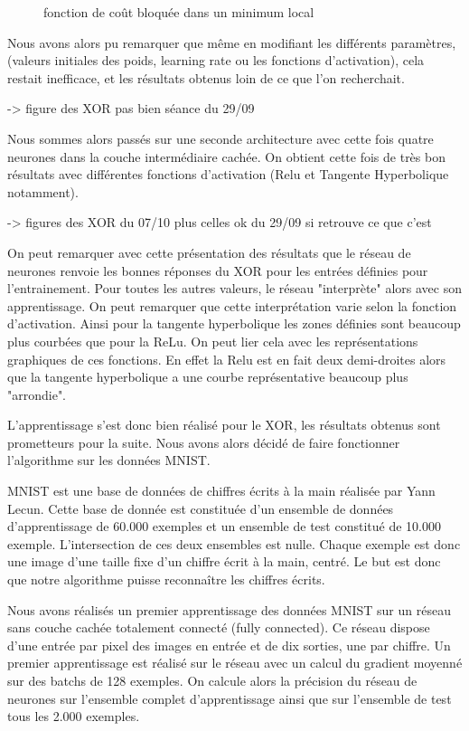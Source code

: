 \documentclass{report}
\begin{document}
\begin{figure}[!h]
\centering

\caption{fonction de coût bloquée dans un minimum local}
\label{xor_cout_bloque}
\end{figure}

Nous avons alors pu remarquer que même en modifiant les différents paramètres, (valeurs initiales des poids, learning rate ou les fonctions d'activation), cela restait inefficace, et les résultats obtenus loin de ce que l'on recherchait.

-> figure des XOR pas bien séance du 29/09

Nous sommes alors passés sur une seconde architecture avec cette fois quatre neurones dans la couche intermédiaire cachée. On obtient cette fois de très bon résultats avec différentes fonctions d'activation (Relu et Tangente Hyperbolique notamment).

-> figures des XOR du 07/10 plus celles ok du 29/09 si retrouve ce que c'est

On peut remarquer avec cette présentation des résultats que le réseau de neurones renvoie les bonnes réponses du XOR pour les entrées définies pour l'entrainement. Pour toutes les autres valeurs,  le réseau "interprète" alors avec son apprentissage. On peut remarquer que cette interprétation varie selon la fonction d'activation. Ainsi pour la tangente hyperbolique les zones définies sont beaucoup plus courbées que pour la ReLu. On peut lier cela avec les représentations graphiques de ces fonctions. En effet la Relu est en fait deux demi-droites alors que la tangente hyperbolique a une courbe représentative beaucoup plus "arrondie".

L'apprentissage s'est donc bien réalisé pour le XOR, les résultats obtenus sont prometteurs pour la suite. Nous avons alors décidé de faire fonctionner l'algorithme sur les données MNIST.

MNIST est une base de données de chiffres écrits à la main réalisée par Yann Lecun. Cette base de donnée est constituée d'un ensemble de données d'apprentissage de 60.000 exemples et un ensemble de test constitué de 10.000 exemple. L'intersection de ces deux ensembles est nulle. Chaque exemple est donc une image d'une taille fixe d'un chiffre écrit à la main, centré. Le but est donc que notre algorithme puisse reconnaître les chiffres écrits.

Nous avons réalisés un premier apprentissage des données MNIST sur un réseau sans couche cachée totalement connecté (fully connected). Ce réseau dispose d'une entrée par pixel des images en entrée et de dix sorties, une par chiffre. Un premier apprentissage est réalisé sur le réseau avec un calcul du gradient moyenné sur des batchs de 128 exemples. On calcule alors la précision du réseau de neurones sur l'ensemble complet d'apprentissage ainsi que sur l'ensemble de test tous les 2.000 exemples.
\end{document}
